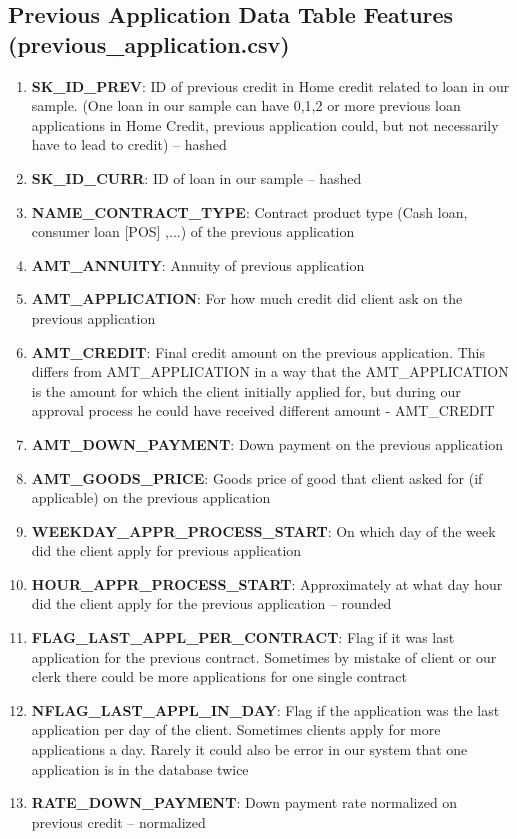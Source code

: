 \documentclass[12pt, letterpaper]{article}
\begin{document}
\begin{appendices}
\subsection{Previous Application Data Table Features (previous_application.csv)}
\begin{enumerate}
  \item \textbf{SK_ID_PREV}: ID of previous credit in Home credit related to loan in our sample. (One loan in our sample can have 0,1,2 or more previous loan applications in Home Credit, previous application could, but not necessarily have to lead to credit) -- hashed
  \item \textbf{SK_ID_CURR}: ID of loan in our sample -- hashed
  \item \textbf{NAME_CONTRACT_TYPE}: Contract product type (Cash loan, consumer loan [POS] ,...) of the previous application
  \item \textbf{AMT_ANNUITY}: Annuity of previous application
  \item \textbf{AMT_APPLICATION}: For how much credit did client ask on the previous application
  \item \textbf{AMT_CREDIT}: Final credit amount on the previous application. This differs from AMT_APPLICATION in a way that the AMT_APPLICATION is the amount for which the client initially applied for, but during our approval process he could have received different amount - AMT_CREDIT
  \item \textbf{AMT_DOWN_PAYMENT}: Down payment on the previous application
  \item \textbf{AMT_GOODS_PRICE}: Goods price of good that client asked for (if applicable) on the previous application
  \item \textbf{WEEKDAY_APPR_PROCESS_START}: On which day of the week did the client apply for previous application
  \item \textbf{HOUR_APPR_PROCESS_START}: Approximately at what day hour did the client apply for the previous application -- rounded
  \item \textbf{FLAG_LAST_APPL_PER_CONTRACT}: Flag if it was last application for the previous contract. Sometimes by mistake of client or our clerk there could be more applications for one single contract
  \item \textbf{NFLAG_LAST_APPL_IN_DAY}: Flag if the application was the last application per day of the client. Sometimes clients apply for more applications a day. Rarely it could also be error in our system that one application is in the database twice
  \item \textbf{RATE_DOWN_PAYMENT}: Down payment rate normalized on previous credit -- normalized

\end{enumerate}
\end{appendices}
\end{document}
